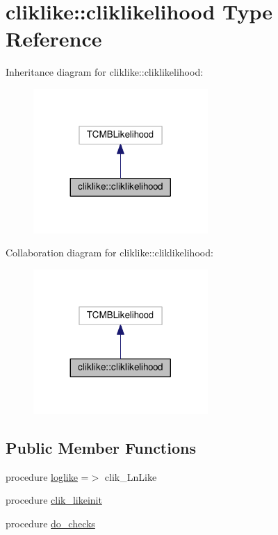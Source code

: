\hypertarget{structcliklike_1_1cliklikelihood}{}\section{cliklike\+:\+:cliklikelihood Type Reference}
\label{structcliklike_1_1cliklikelihood}


Inheritance diagram for cliklike\+:\+:cliklikelihood\+:
\nopagebreak
\begin{figure}[H]
\begin{center}
\leavevmode
\includegraphics[width=188pt]{structcliklike_1_1cliklikelihood__inherit__graph}
\end{center}
\end{figure}


Collaboration diagram for cliklike\+:\+:cliklikelihood\+:
\nopagebreak
\begin{figure}[H]
\begin{center}
\leavevmode
\includegraphics[width=188pt]{structcliklike_1_1cliklikelihood__coll__graph}
\end{center}
\end{figure}
\subsection*{Public Member Functions}
\begin{DoxyCompactItemize}
\item 
procedure \mbox{\hyperlink{structcliklike_1_1cliklikelihood_a4458d765845bd68054c2148244d3678b}{loglike}} =$>$ clik\+\_\+\+Ln\+Like
\item 
procedure \mbox{\hyperlink{structcliklike_1_1cliklikelihood_a58a26c7fd7b72af9480a08dfb7c2d172}{clik\+\_\+likeinit}}
\item 
procedure \mbox{\hyperlink{structcliklike_1_1cliklikelihood_a62a4c9c406db921097f5f7ef6fa2d846}{do\+\_\+checks}}
\end{DoxyCompactItemize}
